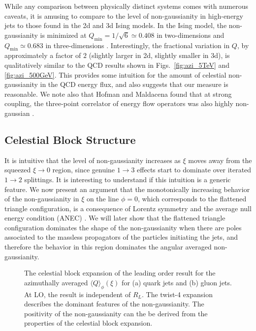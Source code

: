 \documentclass[letterpaper,11pt]{article}
\def\Figs#1#2{Figs.~{\ref{#1}} and {\ref{#2}}}
\def\to{\rightarrow}
\DeclareRobustCommand{\Figs}[2]{Figs.~\ref{#1} and \ref{#2}}
\begin{document}
While any comparison between physically distinct systems comes with numerous caveats, it is amusing to compare to the level of non-gaussianity in high-energy jets to those found in the 2d and 3d Ising models.
%
In the Ising model, the non-gaussianity is minimized at $Q_{\text{min}}=1/\sqrt{6} \simeq 0.408$ in two-dimensions \cite{Belavin:1984vu} and $Q_{\text{min}}\simeq 0.683$ in three-dimensions \cite{Rychkov:2016mrc}.
%
Interestingly, the fractional variation in $Q$, by approximately a factor of $2$ (slightly larger in 2d, slightly smaller in 3d), is qualitatively similar to the QCD results shown in \Figs{fig:azi_5TeV}{fig:azi_500GeV}.
%
This provides some intuition for the amount of celestial non-gaussianity in the QCD energy flux, and also suggests that our measure is reasonable. 
%
We note also that Hofman and Maldacena found that at strong coupling, the three-point correlator of energy flow operators was also highly non-gaussian \cite{Hofman:2008ar}.

\subsection{Celestial Block Structure}

It is intuitive that the level of non-gaussianity increases as $\xi$ moves away from the squeezed $\xi \to 0$ region, since genuine $1 \to 3$ effects start to dominate over iterated $1 \to 2$ splittings.
%
It is interesting to understand if this intuition is a generic feature.
%
We now present an argument that  the monotonically increasing behavior of the non-gaussianity in $\xi$ on the line $\phi=0$, which corresponds to the flattened triangle configuration, is a consequence of Lorentz symmetry and the average null energy condition (ANEC) \cite{Tipler:1978zz,Klinkhammer:1991ki,Wald:1991xn,Hofman:2008ar,Faulkner:2016mzt,Hartman:2016lgu}. We will later show that the flattened triangle configuration dominates the shape of the non-gaussianity when there are poles associated to the massless propagators of the particles initiating the jets, and therefore the behavior in this region dominates the angular averaged non-gaussianity.  

\begin{figure}
\begin{center}
\qquad
{}\qquad
\end{center}
\caption{
%
The celestial block expansion of the leading order result for the azimuthally averaged $\langle Q \rangle_\phi (\xi)$ for (a) quark jets and (b) gluon jets.
%
At LO, the result is independent of $R_L$.
%
The twist-4 expansion describes the dominant features of the non-gaussianity. The positivity of the non-gaussianity can the be derived from the properties of the celestial block expansion.}
\label{fig:block_expand}
\end{figure}
\end{document}
